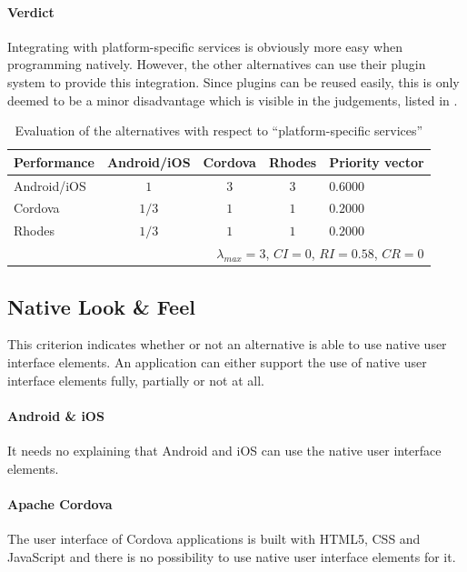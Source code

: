 \paragraph{Verdict} Integrating with platform-specific services is obviously more easy when programming natively. However, the other alternatives can use their plugin system to provide this integration. Since   plugins can be reused easily, this is only deemed to be a minor disadvantage which is visible in the judgements, listed in . 

\begin{table}[h!]
    \begin{center}
        \begin{tabular}{lcccl}
            \hline
            \textbf{Performance} & Android/iOS & Cordova & Rhodes & Priority vector \\
            \hline
            Android/iOS          & $1$         & $3$     & $3$   & $0.6000$        \\
            Cordova              & $1/3$       & $1$     & $1$   & $0.2000$        \\
            Rhodes               & $1/3$       & $1$     & $1$   & $0.2000$        \\
            \hline
            \multicolumn{5}{r}{$\lambda_{max} = 3$, $CI = 0$, $RI = 0.58$, $CR = 0$}\\
            \hline
        \end{tabular}
        \caption{Evaluation of the alternatives with respect to ``platform-specific services''}
        \label{tab:pss}
    \end{center}
\end{table}

\subsection{Native Look \& Feel}

This criterion indicates whether or not an alternative is able to use native user interface elements. An application can either support the use of native user interface elements fully, partially or not at all.

\paragraph{Android \& iOS} It needs no explaining that Android and iOS can use the native user interface elements.

\paragraph{Apache Cordova} The user interface of Cordova applications is built with HTML5, CSS and JavaScript and there is no possibility to use native user interface elements for it. 

